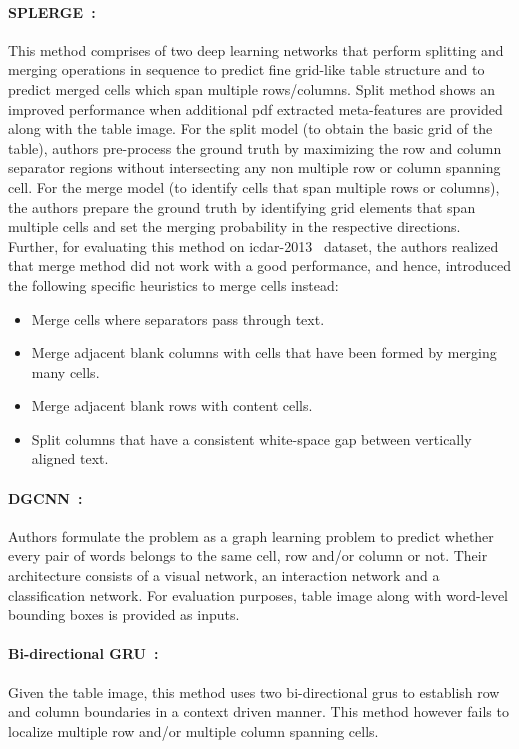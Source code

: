 \documentclass[runningheads]{llncs}
\begin{document}
\paragraph{\textbf{SPLERGE~\cite{table_splitting}:}} This method comprises of two deep learning networks that perform splitting and merging operations in sequence to predict fine grid-like table structure and to predict merged cells which span multiple rows/columns. Split method shows an improved performance when additional {\sc pdf} extracted meta-features are provided along with the table image. For the split model (to obtain the basic grid of the table), authors pre-process the ground truth by maximizing the row and column separator regions without intersecting any non multiple row or column spanning cell. For the merge model (to identify cells that span multiple rows or columns), the authors prepare the ground truth by identifying grid elements that span multiple cells and set the merging probability in the respective directions. Further, for evaluating this method on {\sc icdar}-2013~\cite{gobel2013icdar} dataset, the authors realized that merge method did not work with a good performance, and hence, introduced the following specific heuristics to merge cells instead:
\begin{itemize}
    \item Merge cells where separators pass through text.
    \item Merge adjacent blank columns with cells that have been formed by merging many cells.
    \item Merge adjacent blank rows with content cells.
    \item Split columns that have a consistent white-space gap between vertically aligned text.
\end{itemize}

\paragraph{\textbf{DGCNN~\cite{qasim2019rethinking}:}} Authors formulate the problem as a graph learning problem to predict whether every pair of words belongs to the same cell, row and/or column or not. Their architecture consists of a visual network, an interaction network and a classification network. For evaluation purposes, table image along with word-level bounding boxes is provided as inputs.
    
\paragraph{\textbf{Bi-directional GRU~\cite{Khan_2019}:}} Given the table image, this method uses two bi-directional {\sc gru}s to establish row and column boundaries in a context driven manner. This method however fails to localize multiple row and/or multiple column spanning cells.
    
\end{document}

